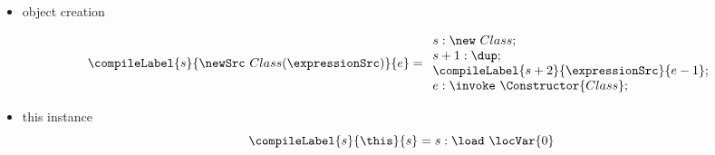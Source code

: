 \begin{itemize}
 
 \item object creation
    
   $$\compileLabel{s}{ \newSrc \ Class (\expressionSrc ) }{e} =
                 \begin{array}{l}
                       s :    \new \ Class; \\ 
		       s + 1: \dup; \\
		       \compileLabel{s+2}{\expressionSrc}{e - 1 };\\
	               
		       e : \invoke \ \Constructor{Class};     
	       \end{array}$$
 		        
\item this instance
  $$\compileLabel{s}{\this}{s } = s:  \load \ \locVar{0}$$
              	              
\end{itemize}
